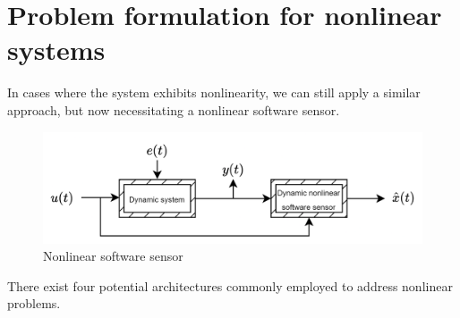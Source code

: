 \section{Problem formulation for nonlinear systems}

In cases where the system exhibits nonlinearity, we can still apply a similar approach, but now necessitating a nonlinear software sensor.
\begin{figure}[H]
    \centering
    \includegraphics[width=0.75\linewidth]{images/lin.png}
    \caption{Nonlinear software sensor}
\end{figure}
There exist four potential architectures commonly employed to address nonlinear problems.


